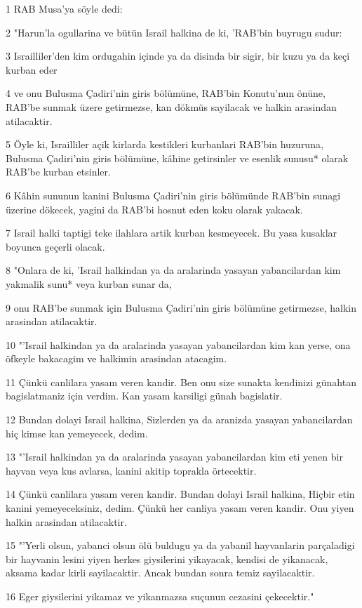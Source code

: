 \par 1 RAB Musa'ya söyle dedi:
\par 2 "Harun'la ogullarina ve bütün Israil halkina de ki, 'RAB'bin buyrugu sudur:
\par 3 Israilliler'den kim ordugahin içinde ya da disinda bir sigir, bir kuzu ya da keçi kurban eder
\par 4 ve onu Bulusma Çadiri'nin giris bölümüne, RAB'bin Konutu'nun önüne, RAB'be sunmak üzere getirmezse, kan dökmüs sayilacak ve halkin arasindan atilacaktir.
\par 5 Öyle ki, Israilliler açik kirlarda kestikleri kurbanlari RAB'bin huzuruna, Bulusma Çadiri'nin giris bölümüne, kâhine getirsinler ve esenlik sunusu* olarak RAB'be kurban etsinler.
\par 6 Kâhin sununun kanini Bulusma Çadiri'nin giris bölümünde RAB'bin sunagi üzerine dökecek, yagini da RAB'bi hosnut eden koku olarak yakacak.
\par 7 Israil halki taptigi teke ilahlara artik kurban kesmeyecek. Bu yasa kusaklar boyunca geçerli olacak.
\par 8 "Onlara de ki, 'Israil halkindan ya da aralarinda yasayan yabancilardan kim yakmalik sunu* veya kurban sunar da,
\par 9 onu RAB'be sunmak için Bulusma Çadiri'nin giris bölümüne getirmezse, halkin arasindan atilacaktir.
\par 10 "'Israil halkindan ya da aralarinda yasayan yabancilardan kim kan yerse, ona öfkeyle bakacagim ve halkimin arasindan atacagim.
\par 11 Çünkü canlilara yasam veren kandir. Ben onu size sunakta kendinizi günahtan bagislatmaniz için verdim. Kan yasam karsiligi günah bagislatir.
\par 12 Bundan dolayi Israil halkina, Sizlerden ya da aranizda yasayan yabancilardan hiç kimse kan yemeyecek, dedim.
\par 13 "'Israil halkindan ya da aralarinda yasayan yabancilardan kim eti yenen bir hayvan veya kus avlarsa, kanini akitip toprakla örtecektir.
\par 14 Çünkü canlilara yasam veren kandir. Bundan dolayi Israil halkina, Hiçbir etin kanini yemeyeceksiniz, dedim. Çünkü her canliya yasam veren kandir. Onu yiyen halkin arasindan atilacaktir.
\par 15 "'Yerli olsun, yabanci olsun ölü buldugu ya da yabanil hayvanlarin parçaladigi bir hayvanin lesini yiyen herkes giysilerini yikayacak, kendisi de yikanacak, aksama kadar kirli sayilacaktir. Ancak bundan sonra temiz sayilacaktir.
\par 16 Eger giysilerini yikamaz ve yikanmazsa suçunun cezasini çekecektir."

